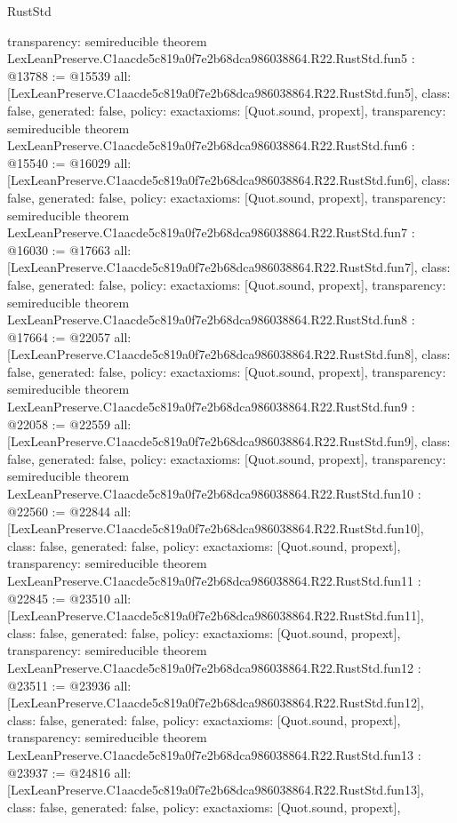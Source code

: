\begin{lexlean}{RustStd}
\begin{coremodule}
{  transparency: semireducible
}
theorem LexLeanPreserve.C1aacde5c819a0f7e2b68dca986038864.R22.RustStd.fun5 : @13788 := @15539 {
  all: [LexLeanPreserve.C1aacde5c819a0f7e2b68dca986038864.R22.RustStd.fun5],
  class: false,
  generated: false,
  policy: exact{axioms: [Quot.sound, propext]},
  transparency: semireducible
}
theorem LexLeanPreserve.C1aacde5c819a0f7e2b68dca986038864.R22.RustStd.fun6 : @15540 := @16029 {
  all: [LexLeanPreserve.C1aacde5c819a0f7e2b68dca986038864.R22.RustStd.fun6],
  class: false,
  generated: false,
  policy: exact{axioms: [Quot.sound, propext]},
  transparency: semireducible
}
theorem LexLeanPreserve.C1aacde5c819a0f7e2b68dca986038864.R22.RustStd.fun7 : @16030 := @17663 {
  all: [LexLeanPreserve.C1aacde5c819a0f7e2b68dca986038864.R22.RustStd.fun7],
  class: false,
  generated: false,
  policy: exact{axioms: [Quot.sound, propext]},
  transparency: semireducible
}
theorem LexLeanPreserve.C1aacde5c819a0f7e2b68dca986038864.R22.RustStd.fun8 : @17664 := @22057 {
  all: [LexLeanPreserve.C1aacde5c819a0f7e2b68dca986038864.R22.RustStd.fun8],
  class: false,
  generated: false,
  policy: exact{axioms: [Quot.sound, propext]},
  transparency: semireducible
}
theorem LexLeanPreserve.C1aacde5c819a0f7e2b68dca986038864.R22.RustStd.fun9 : @22058 := @22559 {
  all: [LexLeanPreserve.C1aacde5c819a0f7e2b68dca986038864.R22.RustStd.fun9],
  class: false,
  generated: false,
  policy: exact{axioms: [Quot.sound, propext]},
  transparency: semireducible
}
theorem LexLeanPreserve.C1aacde5c819a0f7e2b68dca986038864.R22.RustStd.fun10 : @22560 := @22844 {
  all: [LexLeanPreserve.C1aacde5c819a0f7e2b68dca986038864.R22.RustStd.fun10],
  class: false,
  generated: false,
  policy: exact{axioms: [Quot.sound, propext]},
  transparency: semireducible
}
theorem LexLeanPreserve.C1aacde5c819a0f7e2b68dca986038864.R22.RustStd.fun11 : @22845 := @23510 {
  all: [LexLeanPreserve.C1aacde5c819a0f7e2b68dca986038864.R22.RustStd.fun11],
  class: false,
  generated: false,
  policy: exact{axioms: [Quot.sound, propext]},
  transparency: semireducible
}
theorem LexLeanPreserve.C1aacde5c819a0f7e2b68dca986038864.R22.RustStd.fun12 : @23511 := @23936 {
  all: [LexLeanPreserve.C1aacde5c819a0f7e2b68dca986038864.R22.RustStd.fun12],
  class: false,
  generated: false,
  policy: exact{axioms: [Quot.sound, propext]},
  transparency: semireducible
}
theorem LexLeanPreserve.C1aacde5c819a0f7e2b68dca986038864.R22.RustStd.fun13 : @23937 := @24816 {
  all: [LexLeanPreserve.C1aacde5c819a0f7e2b68dca986038864.R22.RustStd.fun13],
  class: false,
  generated: false,
  policy: exact{axioms: [Quot.sound, propext]},
}
\end{coremodule}
\end{lexlean}
